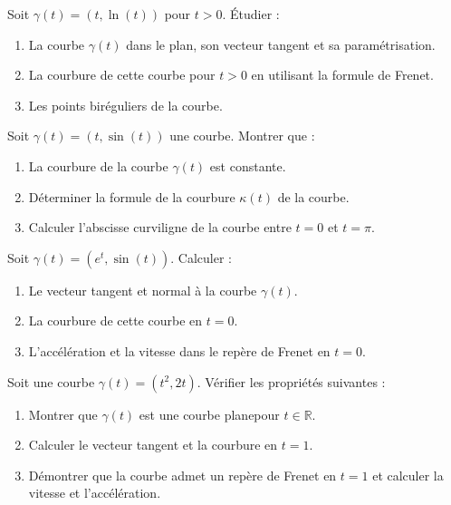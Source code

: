 \begin{exercice}
Soit \( \gamma(t) = (t, \ln(t)) \) pour \( t > 0 \). Étudier :
\begin{enumerate}
    \item La courbe \( \gamma(t) \) dans le plan, son vecteur tangent et sa paramétrisation.
    \item La courbure de cette courbe pour \( t > 0 \) en utilisant la formule de Frenet.
    \item Les points biréguliers de la courbe.
\end{enumerate}
\end{exercice}

\begin{exercice}
Soit \( \gamma(t) = (t, \sin(t)) \) une courbe. Montrer que :
\begin{enumerate}
    \item La courbure de la courbe \( \gamma(t) \) est constante.
    \item Déterminer la formule de la courbure \( \kappa(t) \) de la courbe.
    \item Calculer l'abscisse curviligne de la courbe entre \( t = 0 \) et \( t = \pi \).
\end{enumerate}
\end{exercice}

\begin{exercice}
Soit \( \gamma(t) = (e^t, \sin(t)) \). Calculer :
\begin{enumerate}
    \item Le vecteur tangent et normal à la courbe \( \gamma(t) \).
    \item La courbure de cette courbe en \( t = 0 \).
    \item L'accélération et la vitesse dans le repère de Frenet en \( t = 0 \).
\end{enumerate}
\end{exercice}

\begin{exercice}
Soit une courbe \( \gamma(t) = (t^2, 2t) \). Vérifier les propriétés suivantes :
\begin{enumerate}
    \item Montrer que \( \gamma(t) \) est une courbe planepour \( t \in \mathbb{R} \).
    \item Calculer le vecteur tangent et la courbure en \( t = 1 \).
    \item Démontrer que la courbe admet un repère de Frenet en \( t = 1 \) et calculer la vitesse et l'accélération.
\end{enumerate}
\end{exercice}

